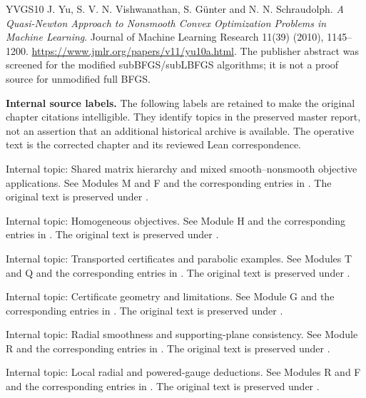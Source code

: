\begin{thebibliography}{YVGS10}
 J. Yu, S. V. N. Vishwanathan, S. G\"unter and N. N. Schraudolph. \emph{A Quasi-Newton Approach to Nonsmooth Convex Optimization Problems in Machine Learning}. Journal of Machine Learning Research 11(39) (2010), 1145--1200. \url{https://www.jmlr.org/papers/v11/yu10a.html}. The publisher abstract was screened for the modified subBFGS/subLBFGS algorithms; it is not a proof source for unmodified full BFGS.

\item[]\textbf{Internal source labels.} The following labels are retained to make the original chapter citations intelligible. They identify topics in the preserved master report, not an assertion that an additional historical archive is available. The operative text is the corrected chapter and its reviewed Lean correspondence.

 Internal topic: Shared matrix hierarchy and mixed smooth--nonsmooth objective applications. See Modules M and F and the corresponding entries in . The original text is preserved under .

 Internal topic: Homogeneous objectives. See Module H and the corresponding entries in . The original text is preserved under .

 Internal topic: Transported certificates and parabolic examples. See Modules T and Q and the corresponding entries in . The original text is preserved under .

 Internal topic: Certificate geometry and limitations. See Module G and the corresponding entries in . The original text is preserved under .

 Internal topic: Radial smoothness and supporting-plane consistency. See Module R and the corresponding entries in . The original text is preserved under .

 Internal topic: Local radial and powered-gauge deductions. See Modules R and F and the corresponding entries in . The original text is preserved under .


\end{thebibliography}
